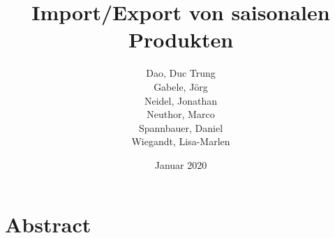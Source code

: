 \documentclass{article}
\title{Import/Export von saisonalen Produkten}
\author{
  Dao, Duc Trung\\
  Gabele, Jörg\\
  Neidel, Jonathan\\
  Neuthor, Marco\\
  Spannbauer, Daniel\\
  Wiegandt, Lisa-Marlen
}
\date{Januar 2020}
\begin{document}
\maketitle

\vfill
\section*{Abstract}


\break
\tableofcontents
\break



\break
\printbibliography
\end{document}
